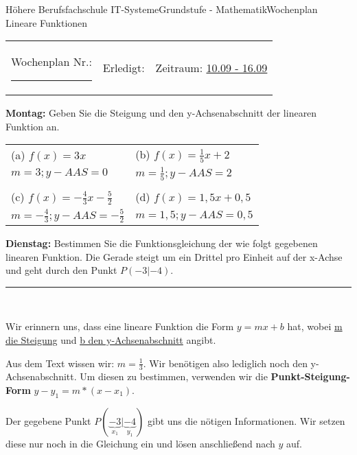 \documentclass[oneside,openany,headings=optiontotoc,11pt,numbers=noenddot]{scrreprt}
\begin{document}
	\begin{worksheet}{Höhere Berufsfachschule IT-Systeme}{Grundstufe - Mathematik}{Wochenplan Lineare Funktionen}
		\noindent
		\begin{tabularx}{\textwidth}{XXl}
			Wochenplan Nr.: \rule{0.15\textwidth}{1pt} & Erledigt: & Zeitraum: \underline{10.09 - 16.09}
		\end{tabularx}
	
		\begin{framed}
			\noindent
			\textbf{Montag:} Geben Sie die Steigung und den y-Achsenabschnitt der linearen Funktion an.\\
			\par\noindent
			\begin{tabularx}{\textwidth}{XX}
				(a) \(f(x) = 3x\) & (b) \(f(x) = \frac{1}{5}x +2\)\\
				\colorbox{green!10}{\(m = 3; y-AAS = 0\)} & \colorbox{green!10}{\(m = \frac{1}{5}; y-AAS = 2\)}\\
				\\
				(c) \(f(x) = -\frac{4}{3}x -\frac{5}{2}\) & (d) \(f(x) = 1,5x+0,5\)\\
				\colorbox{green!10}{\(m=-\frac{4}{3}; y-AAS = -\frac{5}{2}\)} & \colorbox{green!10}{\(m = 1,5; y-AAS = 0,5\)}
			\end{tabularx}
		\end{framed}
		\begin{framed}
			\noindent
			\textbf{Dienstag:} Bestimmen Sie die Funktionsgleichung der wie folgt gegebenen linearen Funktion.
			\indent{} Die Gerade steigt um ein Drittel pro Einheit auf der x-Achse und geht durch den Punkt \(P(-3|-4)\).
			\begin{center}
				\rule{0.9\textwidth}{0.1pt}\\
			\end{center}
			Wir erinnern uns, dass eine lineare Funktion die Form \colorbox{green!10}{\(y = mx + b\)} hat, wobei \underline{m die Steigung} und \underline{b den y-Achsenabschnitt} angibt.\\
			\par\noindent
			Aus dem Text wissen wir: \(m = \frac{1}{3}\). Wir benötigen also lediglich noch den y-Achsenabschnitt. Um diesen zu bestimmen, verwenden wir die \textbf{Punkt-Steigung-Form} \(y-y_1 = m*(x-x_1)\).\\
			\par\noindent
			Der gegebene Punkt \(P(\underbrace{-3}_{x_1}|\underbrace{-4}_{y_1})\) gibt uns die nötigen Informationen. Wir setzen diese nur noch in die Gleichung ein und lösen anschließend nach \(y\) auf.\\

\end{framed}
\end{worksheet}
\end{document}

